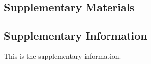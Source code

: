 \documentclass[
]{scrartcl}
\newcommand{\beginsupplement}{
\setcounter{page}{1} %
\setcounter{section}{0} %
\renewcommand{\thesection}{}
\renewcommand{\thesubsection}{\Alph{subsection}}
\setcounter{table}{0} %
\renewcommand{\thetable}{\Alph{table}}
\setcounter{figure}{0} %
\renewcommand{\thefigure}{\Alph{figure}}%
\setcounter{equation}{0} %
\renewcommand{\theequation}{S\arabic{equation}}%
}
\begin{document}
\begin{refsection}
\beginsupplement

\tableofcontents

\section*{Supplementary Materials}\label{supplementary-materials}

\subsection{Supplementary Information}\label{supplementary-information}

This is the supplementary information. \autocite{newton1687}

\printbibliography[title={Supplemental References},
section=\therefsection]
\end{refsection}
\end{document}
